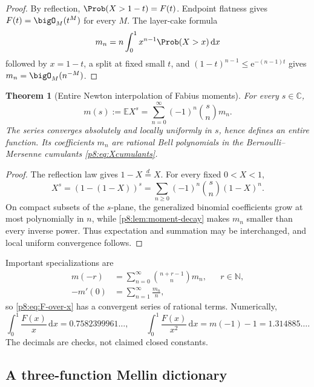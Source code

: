 \documentclass[11pt,oneside]{article}
\newtheorem{theorem}{Theorem}[section]
\theoremstyle{definition}
\theoremstyle{remark}
\newcommand{\E}{\mathbb E}
\newcommand{\C}{\mathbb C}
\newcommand{\N}{\mathbb N}
\newcommand{\dd}{\,\mathrm d}
\newcommand{\e}{\mathrm e}
\newcommand{\1}{\mathbf 1}
\begin{document}
\begin{proof}
By reflection, \(\Prob(X>1-t)=F(t)\).  Endpoint flatness gives
\(F(t)=\bigO_M(t^M)\) for every \(M\).  The layer-cake formula
\[
 m_n=n\int_0^1x^{n-1}\Prob(X>x)\dd x
\]
followed by \(x=1-t\), a split at fixed small \(t\), and
\((1-t)^{n-1}\le\e^{-(n-1)t}\) gives \(m_n=\bigO_M(n^{-M})\).
\end{proof}

\begin{theorem}[Entire Newton interpolation of Fabius moments]
\label{p8:thm:moment-newton}
For every \(s\in\C\),
\begin{equation}
 \boxed{m(s):=\E X^s
 =\sum_{n=0}^{\infty}(-1)^n\binom{s}{n}m_n.}
 \label{p8:eq:moment-newton}
\end{equation}
The series converges absolutely and locally uniformly in \(s\), hence defines
an entire function.  Its coefficients \(m_n\) are rational Bell polynomials in
the Bernoulli--Mersenne cumulants \eqref{p8:eq:Xcumulants}.  \statusprovedPartll
\end{theorem}

\begin{proof}
The reflection law gives \(1-X\stackrel d=X\).  For every fixed \(0<X<1\),
\[
 X^s=(1-(1-X))^s
 =\sum_{n\ge0}(-1)^n\binom{s}{n}(1-X)^n.
\]
On compact subsets of the \(s\)-plane, the generalized binomial coefficients
grow at most polynomially in \(n\), while \cref{p8:lem:moment-decay} makes \(m_n\)
smaller than every inverse power.  Thus expectation and summation may be
interchanged, and local uniform convergence follows.
\end{proof}

Important specializations are
\begin{align}
 m(-r)&=\sum_{n=0}^{\infty}\binom{n+r-1}{n}m_n,
 &&r\in\N,
 \label{p8:eq:negative-moments-series}\\
 -m'(0)&=\sum_{n=1}^{\infty}\frac{m_n}{n},
 \label{p8:eq:log-moment-series}
\end{align}
so \eqref{p8:eq:F-over-x} has a convergent series of rational terms.  Numerically,
\begin{equation}
 \int_0^1\frac{F(x)}x\dd x
 =0.7582399961\ldots,
 \qquad
 \int_0^1\frac{F(x)}{x^2}\dd x
 =m(-1)-1=1.314885\ldots.
 \label{p8:eq:negative-examples}
\end{equation}
The decimals are checks, not claimed closed constants.

\subsection{A three-function Mellin dictionary}
\end{document}

